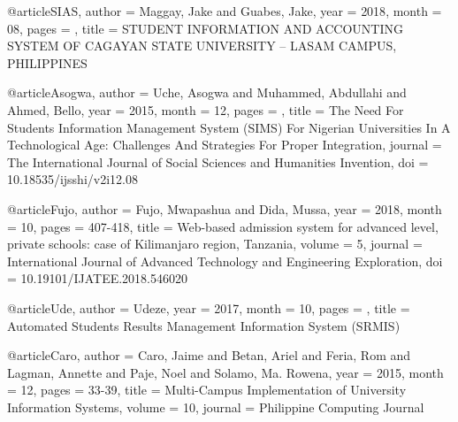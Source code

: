 @article{SIAS,
    author = {Maggay, Jake and Guabes, Jake},
    year = {2018},
    month = {08},
    pages = {},
    title = {STUDENT INFORMATION AND ACCOUNTING SYSTEM OF CAGAYAN STATE UNIVERSITY – LASAM CAMPUS, PHILIPPINES}
}

@article{Asogwa,
    author = {Uche, Asogwa and Muhammed, Abdullahi and Ahmed, Bello},
    year = {2015},
    month = {12},
    pages = {},
    title = {The Need For Students Information Management System (SIMS) For Nigerian Universities In A Technological Age: Challenges And Strategies For Proper Integration},
    journal = {The International Journal of Social Sciences and Humanities Invention},
    doi = {10.18535/ijsshi/v2i12.08}
}

@article{Fujo,
    author = {Fujo, Mwapashua and Dida, Mussa},
    year = {2018},
    month = {10},
    pages = {407-418},
    title = {Web-based admission system for advanced level, private schools: case of Kilimanjaro region, Tanzania},
    volume = {5},
    journal = {International Journal of Advanced Technology and Engineering Exploration},
    doi = {10.19101/IJATEE.2018.546020}
}

@article{Ude,
    author = {Udeze},
    year = {2017},
    month = {10},
    pages = {},
    title = {Automated Students Results Management Information System (SRMIS)}
}

@article{Caro,
    author = {Caro, Jaime and Betan, Ariel and Feria, Rom and Lagman, Annette and Paje, Noel and Solamo, Ma. Rowena},
    year = {2015},
    month = {12},
    pages = {33-39},
    title = {Multi-Campus Implementation of University Information Systems},
    volume = {10},
    journal = {Philippine Computing Journal}
}





















